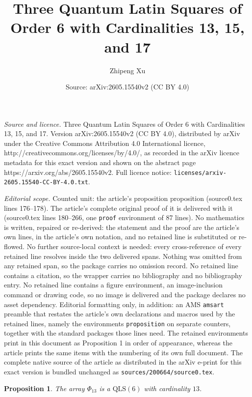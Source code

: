 \documentclass[10pt,a4paper]{amsart}
\title{Three Quantum Latin Squares of Order 6 with Cardinalities 13, 15, and 17}
\author{Zhipeng Xu}
\date{Source: arXiv:2605.15540v2 (CC BY 4.0)}
\newtheorem{proposition}{Proposition}
\newcommand{\QLS}{\mathrm{QLS}}
\begin{document}
\maketitle

\noindent\emph{Source and licence.} Three Quantum Latin Squares of Order 6 with Cardinalities 13, 15, and 17. Version arXiv:2605.15540v2 (CC BY 4.0), distributed by arXiv under the Creative Commons Attribution 4.0 International licence, http://creativecommons.org/licenses/by/4.0/, as recorded in the arXiv licence metadata for this exact version and shown on the abstract page https://arxiv.org/abs/2605.15540v2. Full licence notice: \texttt{licenses/arxiv-2605.15540-CC-BY-4.0.txt}.\par\smallskip

\noindent\textit{Editorial scope.} Counted unit: the article's proposition proposition (source0.tex lines 176--178). The article's complete original proof of it is delivered with it (source0.tex lines 180--266, one \texttt{proof} environment of 87 lines). No mathematics is written, repaired or re-derived: the statement and the proof are the article's own lines, in the article's own notation, and no retained line is substituted or re-flowed.  No further source-local context is needed: every cross-reference of every retained line resolves inside the two delivered spans.  Nothing was omitted from any retained span, so the package carries no omission record.  No retained line contains a citation, so the wrapper carries no bibliography and no bibliography entry.  No retained line contains a figure environment, an image-inclusion command or drawing code, so no image is delivered and the package declares no asset dependency.  Editorial formatting only, in addition: an AMS \texttt{amsart} preamble that restates the article's own declarations and macros used by the retained lines, namely the environments \texttt{proposition} on separate counters, together with the standard packages those lines need.  The retained environments print in this document as Proposition 1 in order of appearance, whereas the article prints the same items with the numbering of its own full document.  The complete native source of the article as distributed in the arXiv e-print for this exact version is bundled unchanged as \texttt{sources/200664/source0.tex}.
\begin{proposition}
The array $\Phi_{13}$ is a $\QLS(6)$ with cardinality $13$.
\end{proposition}
\end{document}
